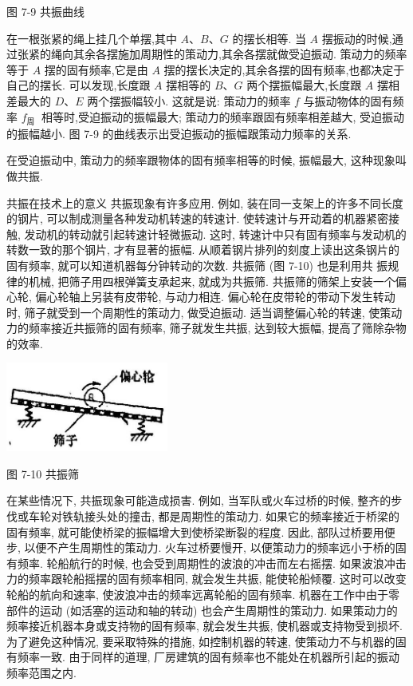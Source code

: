 \documentclass[10pt]{article}
\begin{document}
图 7-9 共振曲线

在一根张紧的绳上挂几个单摆,其中 \(A\text{、}B\text{、}G\) 的摆长相等. 当 \(A\) 摆振动的时候,通过张紧的绳向其余各摆施加周期性的策动力,其余各摆就做受迫振动. 策动力的频率等于 \(A\) 摆的固有频率,它是由 \(A\) 摆的摆长决定的,其余各摆的固有频率,也都决定于自己的摆长. 可以发现,长度跟 \(A\) 摆相等的 \(B\text{、}G\) 两个摆振幅最大,长度跟 \(A\) 摆相差最大的 \(D\text{、}E\) 两个摆振幅较小. 这就是说: 策动力的频率 \(f\) 与振动物体的固有频率 \({f}_{\text{周 }}\) 相等时,受迫振动的振幅最大; 策动力的频率跟固有频率相差越大, 受迫振动的振幅越小. 图 7-9 的曲线表示出受迫振动的振幅跟策动力频率的关系.

在受迫振动中, 策动力的频率跟物体的固有频率相等的时候, 振幅最大, 这种现象叫做共振.

共振在技术上的意义 共振现象有许多应用. 例如, 装在同一支架上的许多不同长度的钢片, 可以制成测量各种发动机转速的转速计. 使转速计与开动着的机器紧密接触, 发动机的转动就引起转速计轻微振动. 这时, 转速计中只有固有频率与发动机的转数一致的那个钢片, 才有显著的振幅. 从顺着钢片排列的刻度上读出这条钢片的固有频率, 就可以知道机器每分钟转动的次数. 共振筛 (图 7-10) 也是利用共 振规律的机械, 把筛子用四根弹簧支承起来, 就成为共振筛. 共振筛的筛架上安装一个偏心轮, 偏心轮轴上另装有皮带轮, 与动力相连. 偏心轮在皮带轮的带动下发生转动时, 筛子就受到一个周期性的策动力, 做受迫振动. 适当调整偏心轮的转速, 使策动力的频率接近共振筛的固有频率, 筛子就发生共振, 达到较大振幅, 提高了筛除杂物的效率.

\begin{center}
\includegraphics[max width=0.4\textwidth]{images/01912d55-147c-70aa-b0e0-1782a122f948_203_602748.jpg}
\end{center}

图 7-10 共振筛

在某些情况下, 共振现象可能造成损害. 例如, 当军队或火车过桥的时候, 整齐的步伐或车轮对铁轨接头处的撞击, 都是周期性的策动力. 如果它的频率接近于桥梁的固有频率, 就可能使桥梁的振幅增大到使桥梁断裂的程度. 因此, 部队过桥要用便步, 以便不产生周期性的策动力. 火车过桥要慢开, 以便策动力的频率远小于桥的固有频率. 轮船航行的时候, 也会受到周期性的波浪的冲击而左右摇摆. 如果波浪冲击力的频率跟轮船摇摆的固有频率相同, 就会发生共振, 能使轮船倾覆. 这时可以改变轮船的航向和速率, 使波浪冲击的频率远离轮船的固有频率. 机器在工作中由于零部件的运动 (如活塞的运动和轴的转动) 也会产生周期性的策动力. 如果策动力的频率接近机器本身或支持物的固有频率, 就会发生共振, 使机器或支持物受到损坏. 为了避免这种情况, 要采取特殊的措施, 如控制机器的转速, 使策动力不与机器的固有频率一致. 由于同样的道理, 厂房建筑的固有频率也不能处在机器所引起的振动频率范围之内.
\end{document}
